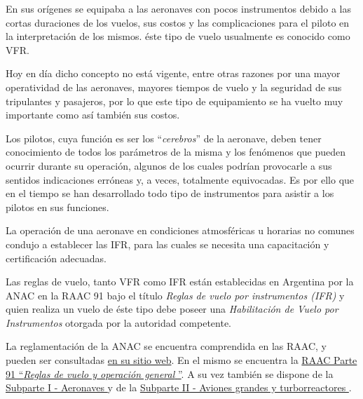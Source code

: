 
En sus or\'igenes se equipaba a las aeronaves con pocos instrumentos debido a las cortas duraciones de los vuelos, sus costos y las complicaciones para el piloto en la interpretaci\'on de los mismos. \'este tipo de vuelo usualmente es conocido como \ac{VFR}.

 Hoy en d\'ia dicho concepto no est\'a vigente, entre otras razones por una mayor operatividad de las aeronaves, mayores tiempos de vuelo y la seguridad de sus tripulantes y pasajeros, por lo que este tipo de equipamiento se ha vuelto muy importante como as\'i tambi\'en sus costos. 

Los pilotos, cuya funci\'on es ser los ``\emph{cerebros}'' de la aeronave, deben tener conocimiento de todos los par\'ametros de la misma y los fen\'omenos que pueden ocurrir durante su operaci\'on, algunos de los cuales podr\'ian provocarle a sus sentidos indicaciones err\'oneas y, a veces, totalmente equivocadas. Es por ello que en el tiempo se han desarrollado todo tipo de instrumentos para asistir a los pilotos en sus funciones. 

La operaci\'on de una aeronave en condiciones atmosf\'ericas u horarias no comunes condujo a establecer las \ac{IFR}, para las cuales se necesita una capacitaci\'on y certificaci\'on adecuadas.

Las reglas de vuelo, tanto \ac{VFR} como \ac{IFR}  est\'an establecidas en Argentina por la \ac{ANAC} 
en la 
{RAAC 91} 
bajo el t\'itulo \emph{Reglas de vuelo por instrumentos (IFR)} 
y quien realiza un vuelo de \'este tipo debe poseer una 
\emph{Habilitación de Vuelo por Instrumentos} otorgada por la autoridad competente.

\begin{tcolorbox}
  La reglamentaci\'on de la ANAC se encuentra comprendida en las \ac{RAAC}, y pueden ser consultadas 
\href{http://www.anac.gov.ar/anac/web/index.php/2/120/normativa/raac-dnar}{en su sitio web}. 
En el mismo se encuentra la 
\href{http://www.anac.gov.ar/anac/web/uploads/normativa/raac/raac_vigentes/por_parte/parte-91-r-1-18.pdf}{RAAC Parte 91 ``{\it Reglas de vuelo y operación general }''}. 
A su vez tambi\'en  se dispone de la  
\href{http://www.anac.gov.ar/anac/web/uploads/normativa/raac/parte-91_subaprte1.pdf}{Subparte I - Aeronaves } 
y de la 
\href{http://www.anac.gov.ar/anac/web/uploads/normativa/raac/parte-91_subparte2.pdf}{Subparte II - Aviones grandes y turborreactores }.

\end{tcolorbox}

